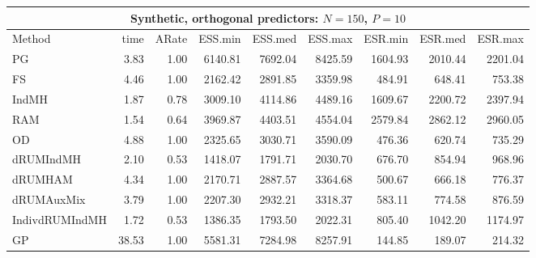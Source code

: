 \begin{table}
\tablesize
\centering
\begin{tabular}{l r r r r r r r r } 
\hline
\multicolumn{9}{c}{Synthetic, orthogonal predictors: $N=150$, $P=10$} \\
\hline
          Method  &   time &  ARate & ESS.min & ESS.med & ESS.max & ESR.min & ESR.med & ESR.max \\ 
            PG  &     3.83 &     1.00 &   6140.81 &   7692.04 &   8425.59 &   1604.93 &   2010.44 &   2201.04 \\ 
            FS  &     4.46 &     1.00 &   2162.42 &   2891.85 &   3359.98 &    484.91 &    648.41 &    753.38 \\ 
         IndMH  &     1.87 &     0.78 &   3009.10 &   4114.86 &   4489.16 &   1609.67 &   2200.72 &   2397.94 \\ 
           RAM  &     1.54 &     0.64 &   3969.87 &   4403.51 &   4554.04 &   2579.84 &   2862.12 &   2960.05 \\ 
            OD  &     4.88 &     1.00 &   2325.65 &   3030.71 &   3590.09 &    476.36 &    620.74 &    735.29 \\ 
     dRUMIndMH  &     2.10 &     0.53 &   1418.07 &   1791.71 &   2030.70 &    676.70 &    854.94 &    968.96 \\ 
       dRUMHAM  &     4.34 &     1.00 &   2170.71 &   2887.57 &   3364.68 &    500.67 &    666.18 &    776.37 \\ 
    dRUMAuxMix  &     3.79 &     1.00 &   2207.30 &   2932.21 &   3318.37 &    583.11 &    774.58 &    876.59 \\ 
IndivdRUMIndMH  &     1.72 &     0.53 &   1386.35 &   1793.50 &   2022.31 &    805.40 &   1042.20 &   1174.97 \\ 
            GP  &    38.53 &     1.00 &   5581.31 &   7284.98 &   8257.91 &    144.85 &    189.07 &    214.32
 \end{tabular}



\end{table}
